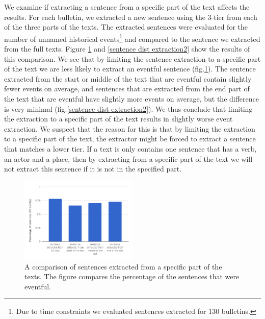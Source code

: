 \documentclass[a4paper, 10pt, conference]{ieeeconf}      %
\begin{document}
We examine if extracting a sentence from a specific part of the text affects the results. For each bulletin, we extracted a new sentence using the 3-tier from each of the three parts of the texts. The extracted sentences were evaluated for the number of unnamed historical events\footnote{Due to time constraints we evaluated sentences extracted for 130 bulletins.} and compared to the sentence we extracted from the full texts. Figure \ref{sentence dist extraction1} and \ref{sentence dist extraction2} show the results of this comparison. We see that by limiting the sentence extraction to a specific part of the text we are less likely to extract an eventful sentence (fig.\ref{sentence dist extraction1}). The sentence extracted from the start or middle of the text that are eventful contain slightly fewer events on average, and sentences that are extracted from the end part of the text that are eventful have slightly more events on average, but the difference is very minimal (fig.\ref{sentence dist extraction2}). We thus conclude that limiting the extraction to a specific part of the text results in slightly worse event extraction. We suspect that the reason for this is that by limiting the extraction to a specific part of the text, the extractor might be forced to extract a sentence that matches a lower tier. If a text is only contains one sentence that has a verb, an actor and a place, then by extracting from a specific part of the text we will not extract this sentence if it is not in the specified part.

\begin{figure}
  \centering
  \includegraphics[width= 0.5\textwidth]{percentageEventfulDist2}
  \caption{A comparison of sentences extracted from a specific part of the texts. The figure compares the percentage of the sentences that were eventful.}
  \label{sentence dist extraction1}
\end{figure}
\end{document}

